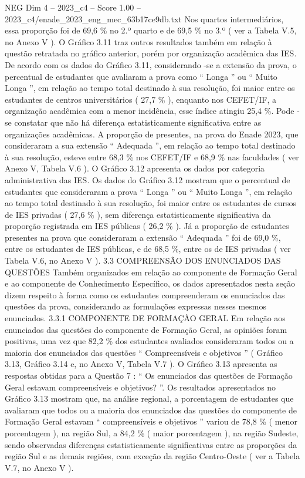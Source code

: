 \begin{textsample}{NEG Dim 4 – 2023\_c4 – Score 1.00 – 2023\_c4/enade\_2023\_eng\_mec\_63b17ce9db.txt}
Nos quartos intermediários, essa proporção foi de 69,6 \% no 2.º quarto e de 69,5 \% no 3.º ( ver a Tabela V.5, no Anexo V ).
O Gráfico 3.11 traz outros resultados também em relação à questão retratada no gráfico anterior, porém por organização acadêmica das IES.
De acordo com os dados do Gráfico 3.11, considerando -se a extensão da prova, o percentual de estudantes que avaliaram a prova como “ Longa ” ou “ Muito Longa ”, em relação ao tempo total destinado à sua resolução, foi maior entre os estudantes de centros universitários ( 27,7 \% ), enquanto nos CEFET/IF, a organização acadêmica com a menor incidência, esse índice atingiu 25,4 \%.
Pode -se constatar que não há diferença estatisticamente significativa entre as organizações acadêmicas.
A proporção de presentes, na prova do Enade 2023, que consideraram a sua extensão “ Adequada ”, em relação ao tempo total destinado à sua resolução, esteve entre 68,3 \% nos CEFET/IF e 68,9 \% nas faculdades ( ver Anexo V, Tabela V.6 ).
O Gráfico 3.12 apresenta os dados por categoria administrativa das IES.
Os dados do Gráfico 3.12 mostram que o percentual de estudantes que consideraram a prova “ Longa ” ou “ Muito Longa ”, em relação ao tempo total destinado à sua resolução, foi maior entre os estudantes de cursos de IES privadas ( 27,6 \% ), sem diferença estatisticamente significativa da proporção registrada em IES públicas ( 26,2 \% ).
Já a proporção de estudantes presentes na prova que consideraram a extensão “ Adequada ” foi de 69,0 \%, entre os estudantes de IES públicas, e de 68,5 \%, entre os de IES privadas ( ver Tabela V.6, no Anexo V ). 3.3 COMPREENSÃO DOS ENUNCIADOS DAS QUESTÕES Também organizados em relação ao componente de Formação Geral e ao componente de Conhecimento Específico, os dados apresentados nesta seção dizem respeito à forma como os estudantes compreenderam os enunciados das questões da prova, considerando as formulações expressas nesses mesmos enunciados. 3.3.1 COMPONENTE DE FORMAÇÃO GERAL Em relação aos enunciados das questões do componente de Formação Geral, as opiniões foram positivas, uma vez que 82,2 \% dos estudantes avaliados consideraram todos ou a maioria dos enunciados das questões “ Compreensíveis e objetivos ” ( Gráfico 3.13, Gráfico 3.14 e, no Anexo V, Tabela V.7 ).
O Gráfico 3.13 apresenta as respostas obtidas para a Questão 7 : “ Os enunciados das questões de Formação Geral estavam compreensíveis e objetivos? ”.
Os resultados apresentados no Gráfico 3.13 mostram que, na análise regional, a porcentagem de estudantes que avaliaram que todos ou a maioria dos enunciados das questões do componente de Formação Geral estavam “ compreensíveis e objetivos ” variou de 78,8 \% ( menor porcentagem ), na região Sul, a 84,2 \% ( maior porcentagem ), na região Sudeste, sendo observadas diferenças estatisticamente significativas entre as proporções da região Sul e as demais regiões, com exceção da região Centro-Oeste ( ver a Tabela V.7, no Anexo V ).

\end{textsample}
